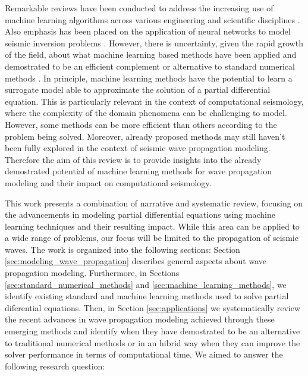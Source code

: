 \documentclass[11pt,twoside]{article}
\begin{document}
Remarkable reviews have been conducted to address the increasing use of machine learning algorithms across various 
engineering and scientific disciplines \citep{vadyala_review_2022,deng_physics-informed_2023,lino_current_2023}. 
Also emphasis has been placed on the application of neural networks to model seismic inversion problems 
\citep{jingbo_research_2023}. However, there is uncertainty, given the rapid growth of the field, about what 
machine learning based methods have been applied and demostrated to be an efficient complement or alternative 
to standard numerical methods \citep{grossmann_can_2023,mcgreivy_weak_2024}. In principle, machine learning 
methods have the potential to learn a surrogate model able to approximate the solution of a partial differential 
equation. This is particularly relevant in the context of computational seismology, where the complexity 
of the domain phenomena can be challenging to model. However, some methods can be more efficient than others 
according to the problem being solved. Moreover, already proposed methods may still haven't been fully explored
in the context of seismic wave propagation modeling. Therefore the aim of this review is to provide insights 
into the already demostrated potential of machine learning methods for wave propagation modeling and their 
impact on computational seismology.

This work presents a combination of narrative and systematic review, focusing on the advancements in modeling 
partial differential equations using machine learning techniques and their resulting impact. While this area 
can be applied to a wide range of problems, our focus will be limited to the propagation of seismic waves. 
The work is organized into the following sections: Section \ref{sec:modeling_wave_propagation} describes 
general aspects about wave propagation modeling. Furthermore, in Sections \ref{sec:standard_numerical_methods} 
and \ref{sec:machine_learning_methods}, we identify existing standard and machine learning methods used to solve 
partial diferential equations. Then, in Section \ref{sec:applications} we 
systematically review the recent advances in wave propagation modeling achieved through these emerging methods 
and identify when they have demostrated to be an alternative to traditional numerical methods or in an 
hibrid way when they can improve the solver performance in terms of computational time. We aimed to answer 
the following research question:

\vspace*{2mm}
\end{document}
